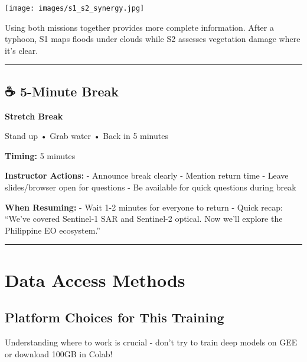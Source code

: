 \documentclass[
  letterpaper,
  DIV=11,
  numbers=noendperiod]{scrartcl}
\begin{document}
\begin{center}
\texttt{[image: images/s1\_s2\_synergy.jpg]}
\end{center}

Using both missions together provides more complete information. After a
typhoon, S1 maps floods under clouds while S2 assesses vegetation damage
where it's clear.

\begin{center}\rule{0.5\linewidth}{0.5pt}\end{center}

\subsection{☕ 5-Minute Break}\label{minute-break}

\textbf{Stretch Break}

Stand up • Grab water • Back in 5 minutes

\textbf{Timing:} 5 minutes

\textbf{Instructor Actions:} - Announce break clearly - Mention return
time - Leave slides/browser open for questions - Be available for quick
questions during break

\textbf{When Resuming:} - Wait 1-2 minutes for everyone to return -
Quick recap: ``We've covered Sentinel-1 SAR and Sentinel-2 optical. Now
we'll explore the Philippine EO ecosystem.''

\begin{center}\rule{0.5\linewidth}{0.5pt}\end{center}

\section{Data Access Methods}\label{data-access-methods}

\subsection{Platform Choices for This
Training}\label{platform-choices-for-this-training}

\begin{tcolorbox}[enhanced jigsaw, left=2mm, opacityback=0, toprule=.15mm, breakable, title=\textcolor{quarto-callout-important-color}{\faExclamation}\hspace{0.5em}{Which Platform for Which Task?}, colbacktitle=quarto-callout-important-color!10!white, arc=.35mm, titlerule=0mm, colback=white, bottomtitle=1mm, colframe=quarto-callout-important-color-frame, leftrule=.75mm, toptitle=1mm, rightrule=.15mm, bottomrule=.15mm, opacitybacktitle=0.6, coltitle=black]

Understanding where to work is crucial - don't try to train deep models
on GEE or download 100GB in Colab!

\end{tcolorbox}
\end{document}
